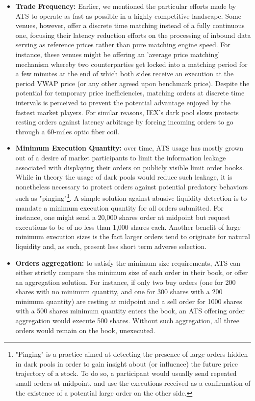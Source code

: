 \begin{itemize}
\item{\textbf{Trade Frequency:}} Earlier, we mentioned the particular efforts made by ATS to operate as fast as possible in a highly competitive landscape. Some venues, however, offer a discrete time matching instead of a fully continuous one, focusing their latency reduction efforts on the processing of inbound data serving as reference prices rather than pure matching engine speed. For instance, these venues might be offering an 'average price matching' mechanism whereby two counterparties get locked into a matching period for a few minutes at the end of which both sides receive an execution at the period VWAP price (or any other agreed upon benchmark price). Despite the potential for temporary price inefficiencies, matching orders at discrete time intervals is perceived to prevent the potential advantage enjoyed by the fastest market players. For similar reasons, IEX's dark pool slows protects resting orders against latency arbitrage by forcing incoming orders to go through a 60-miles optic fiber coil.

\item{\textbf{Minimum Execution Quantity:}} over time, ATS usage has mostly grown out of a desire of market participants to limit the information leakage associated with displaying their orders on publicly visible limit order books. While in theory the usage of dark pools would reduce such leakage, it is nonetheless necessary to protect orders against potential predatory behaviors such as "pinging"\footnote{"Pinging" is a practice aimed at detecting the presence of large orders hidden in dark pools in order to gain insight about (or influence) the future price trajectory of a stock. To do so, a participant would usually send repeated small orders at midpoint, and use the executions received as a confirmation of the existence of a potential large order on the other side.}. A simple solution against abusive liquidity detection is to mandate a minimum execution quantity for all orders submitted. For instance, one might send a 20,000 shares order at midpoint but request executions to be of no less than 1,000 shares each. Another benefit of large minimum execution sizes is the fact larger orders tend to originate for natural liquidity and, as such, present less short term adverse selection.  

\item{\textbf{Orders aggregation:}} to satisfy the minimum size requirements, ATS can either strictly compare the minimum size of each order in their book, or offer an aggregation solution. For instance, if only two buy orders (one for 200 shares with no minimum quantity, and one for 300 shares with a 200 minimum quantity) are resting at midpoint and a sell order for 1000 shares with a 500 shares minimum quantity enters the book, an ATS offering order aggregation would execute 500 shares. Without such aggregation, all three orders would remain on the book, unexecuted.


\end{itemize}
